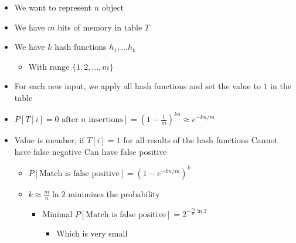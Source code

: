 \begin{itemize}
\begin{itemize}
\begin{itemize}
\begin{itemize}
                        \end{itemize}
                \end{itemize}
                \begin{itemize}
                    \item We want to represent $n$ object
                    \item We have $m$ bits of memory in table $T$
                    \item We have $k$ hash functions $h_1, \dots h_k$
                        \begin{itemize}
                            \item With range $\{1, 2, \dots, m\}$
                        \end{itemize}
                    \item For each new input, we apply all hash functions and set the value to $1$ in the table
                    \item $P[T[i] = 0 \text{ after } n \text{ insertions}] = \left( 1 - \frac{1}{m} \right)^{kn} \approx e^{-kn/m}$
                    \item Value is member, if $T[i] = 1$ for all results of the hash functions
                    \ipro Cannot have false negative
                    \icon Can have false positive
                        \begin{itemize}
                            \item $P[\text{Match is false positive}] = (1 - e^{-kn / m})^k$
                            \item $k \approx \frac{m}{n} \ln 2$ minimizes the probability
                                \begin{itemize}
                                    \item Minimal $P[\text{Match is false positive}] = 2^{-\frac{m}{n} \ln 2}$
                                        \begin{itemize}
                                            \item Which is very small
                                        \end{itemize}
                                \end{itemize}
                        \end{itemize}
                \end{itemize}
                \begin{itemize}

\end{itemize}
\end{itemize}
\end{itemize}
